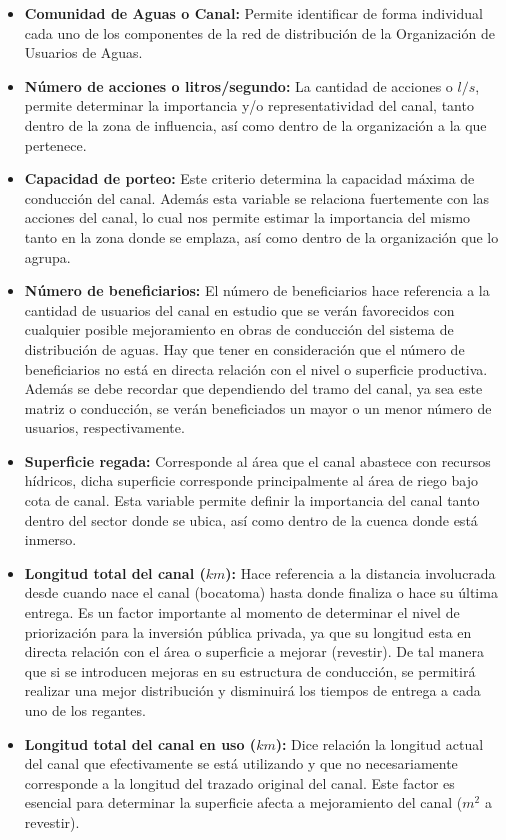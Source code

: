 \documentclass[]{article}
\begin{document}
\begin{itemize}
\item \textbf{Comunidad de Aguas o Canal:} Permite identificar de forma individual cada uno de los componentes de la red de distribución de la Organización de Usuarios de Aguas.
\item \textbf{Número de acciones o litros/segundo:} La cantidad de acciones o $l/s$, permite determinar la importancia y/o representatividad del canal, tanto dentro de la zona de influencia, así como dentro de la organización a la que pertenece.
\item \textbf{Capacidad de porteo:} Este criterio determina la capacidad máxima de conducción del canal. Además esta variable se relaciona fuertemente con las acciones del canal, lo cual nos permite estimar la importancia del mismo tanto en la zona donde se emplaza, así como dentro de la organización que lo agrupa.
\item \textbf{Número de beneficiarios:} El número de beneficiarios hace referencia a la cantidad de usuarios del canal en estudio que se verán favorecidos con cualquier posible mejoramiento en obras de conducción del sistema de distribución de aguas. Hay que tener en consideración que el número de beneficiarios no está en directa relación con el nivel o superficie productiva. Además se debe recordar que dependiendo del tramo del canal, ya sea este matriz o conducción, se verán beneficiados un mayor o un menor número de usuarios, respectivamente.
\item \textbf{Superficie regada:} Corresponde al área que el canal abastece con recursos hídricos, dicha superficie corresponde principalmente al área de riego bajo cota de canal. Esta variable permite definir la importancia del canal tanto dentro del sector donde se ubica, así como dentro de la cuenca donde está inmerso.
\item \textbf{Longitud total del canal ($km$):} Hace referencia a la distancia involucrada desde cuando nace el canal (bocatoma) hasta donde finaliza o hace su última entrega. Es un factor importante al momento de determinar el nivel de priorización para la inversión pública privada, ya que su longitud esta en directa relación con el área o superficie a mejorar (revestir). De tal manera que si se introducen mejoras en su estructura de conducción, se permitirá realizar una mejor distribución y disminuirá los tiempos de entrega a cada uno de los regantes.
\item \textbf{Longitud total del canal en uso ($km$):} Dice relación la longitud actual del canal que efectivamente se está utilizando y que no necesariamente corresponde a la longitud del trazado original del canal. Este factor es esencial para determinar la superficie afecta a mejoramiento del canal ($m^2$ a revestir).

\end{itemize}
\end{document}
